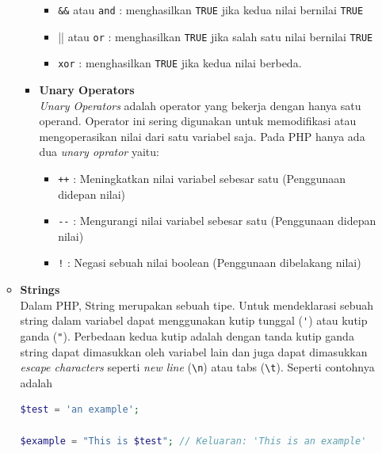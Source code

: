 \documentclass[a4paper,twoside]{article}
\begin{document}
\begin{enumerate}
\begin{itemize}
\begin{itemize}
			                  \begin{itemize}
				                  \item \verb|&&| atau \verb|and| : menghasilkan \verb|TRUE| jika kedua nilai bernilai \verb|TRUE|
				                  \item \verb|||| atau \verb|or| : menghasilkan \verb|TRUE| jika salah satu nilai bernilai \verb|TRUE|
				                  \item \verb|xor| : menghasilkan \verb|TRUE| jika kedua nilai berbeda.
			                  \end{itemize}

			            \item \textbf{Unary Operators} \\
			                  \textit{Unary Operators} adalah operator yang bekerja dengan hanya satu operand. Operator ini sering digunakan untuk memodifikasi atau mengoperasikan nilai dari satu variabel saja. Pada PHP hanya ada dua \textit{unary oprator} yaitu:

			                  \begin{itemize}
				                  \item \verb|++| : Meningkatkan nilai variabel sebesar satu (Penggunaan didepan nilai)
				                  \item \verb|--| : Mengurangi nilai variabel sebesar satu (Penggunaan didepan nilai)
				                  \item \verb|!| : Negasi sebuah nilai boolean (Penggunaan dibelakang nilai)
			                  \end{itemize}
		            \end{itemize}

		      \item \textbf{Strings} \\
		            Dalam PHP, String merupakan sebuah tipe. Untuk mendeklarasi sebuah string dalam variabel dapat menggunakan kutip tunggal (\verb|'|) atau kutip ganda (\verb|"|). Perbedaan kedua kutip adalah dengan tanda kutip ganda string dapat dimasukkan oleh variabel lain dan juga dapat dimasukkan \textit{escape characters} seperti \textit{new line} (\verb|\n|) atau tabs (\verb|\t|). Seperti contohnya adalah

		            \begin{lstlisting}[language={php}, caption={Contoh Pembuatan String}, label={kode:5:string_ex}]
$test = 'an example';

$example = "This is $test"; // Keluaran: 'This is an example'
					\end{lstlisting}


\end{itemize}
\end{enumerate}
\end{document}
